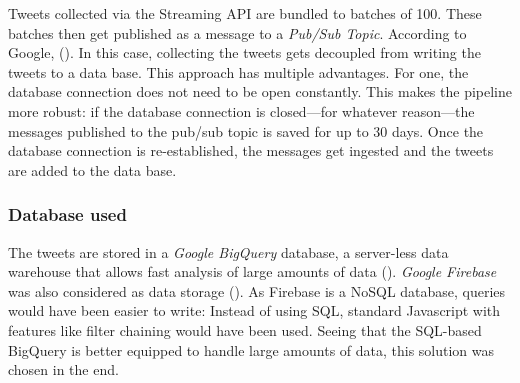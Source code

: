 Tweets collected via the Streaming API are bundled to batches of 100. These batches then get published as a message to a \emph{Pub/Sub Topic}. According to Google,  (\cite{google_what_2020}). In this case, collecting the tweets gets decoupled from writing the tweets to a data base. This approach has multiple advantages. For one, the database connection does not need to be open constantly. This makes the pipeline more robust: if the database connection is closed---for whatever reason---the messages published to the pub/sub topic is saved for up to 30 days. Once the database connection is re-established, the messages get ingested and the tweets are added to the data base.

\subsubsection{Database used}
The tweets are stored in a \emph{Google BigQuery} database, a server-less data warehouse that allows fast analysis of large amounts of data (\cite{google_bigquery_2020}). \emph{Google Firebase} was also considered as data storage (\cite{google_cloud_2020}). As Firebase is a NoSQL database, queries would have been easier to write: Instead of using SQL, standard Javascript with features like filter chaining would have been used. Seeing that the SQL-based BigQuery is better equipped to handle large amounts of data, this solution was chosen in the end.

